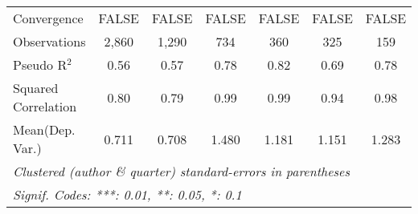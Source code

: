 \begin{tabular}{lcccccc}
   Convergence                                                &FALSE       & FALSE         & FALSE       & FALSE  & FALSE      & FALSE\\  
   Observations                                               & 2,860      & 1,290         & 734         & 360    & 325        & 159\\  
   Pseudo R$^2$                                               & 0.56       & 0.57          & 0.78        & 0.82   & 0.69       & 0.78\\  
   Squared Correlation                                        & 0.80       & 0.79          & 0.99        & 0.99   & 0.94       & 0.98\\  
Mean(Dep. Var.) & 0.711 & 0.708 & 1.480 & 1.181 & 1.151 & 1.283 \\
   \midrule \midrule
   \multicolumn{7}{l}{\emph{Clustered (author \& quarter) standard-errors in parentheses}}\\
   \multicolumn{7}{l}{\emph{Signif. Codes: ***: 0.01, **: 0.05, *: 0.1}}\\
\end{tabular}
\par\endgroup
